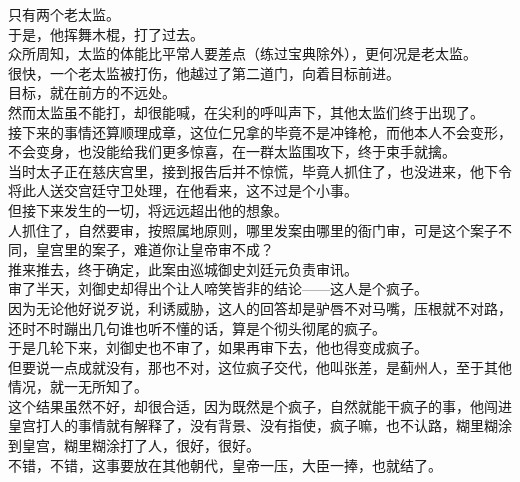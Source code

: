 \begin{multicols}{\theparacolNo}
只有两个老太监。\\

于是，他挥舞木棍，打了过去。\\

众所周知，太监的体能比平常人要差点（练过宝典除外），更何况是老太监。\\

很快，一个老太监被打伤，他越过了第二道门，向着目标前进。\\

目标，就在前方的不远处。\\

然而太监虽不能打，却很能喊，在尖利的呼叫声下，其他太监们终于出现了。\\

接下来的事情还算顺理成章，这位仁兄拿的毕竟不是冲锋枪，而他本人不会变形，不会变身，也没能给我们更多惊喜，在一群太监围攻下，终于束手就擒。\\

当时太子正在慈庆宫里，接到报告后并不惊慌，毕竟人抓住了，也没进来，他下令将此人送交宫廷守卫处理，在他看来，这不过是个小事。\\

但接下来发生的一切，将远远超出他的想象。\\

人抓住了，自然要审，按照属地原则，哪里发案由哪里的衙门审，可是这个案子不同，皇宫里的案子，难道你让皇帝审不成？\\

推来推去，终于确定，此案由巡城御史刘廷元负责审讯。\\

审了半天，刘御史却得出个让人啼笑皆非的结论——这人是个疯子。\\

因为无论他好说歹说，利诱威胁，这人的回答却是驴唇不对马嘴，压根就不对路，还时不时蹦出几句谁也听不懂的话，算是个彻头彻尾的疯子。\\

于是几轮下来，刘御史也不审了，如果再审下去，他也得变成疯子。\\

但要说一点成就没有，那也不对，这位疯子交代，他叫张差，是蓟州人，至于其他情况，就一无所知了。\\

这个结果虽然不好，却很合适，因为既然是个疯子，自然就能干疯子的事，他闯进皇宫打人的事情就有解释了，没有背景、没有指使，疯子嘛，也不认路，糊里糊涂到皇宫，糊里糊涂打了人，很好，很好。\\

不错，不错，这事要放在其他朝代，皇帝一压，大臣一捧，也就结了。\\


\end{multicols}
